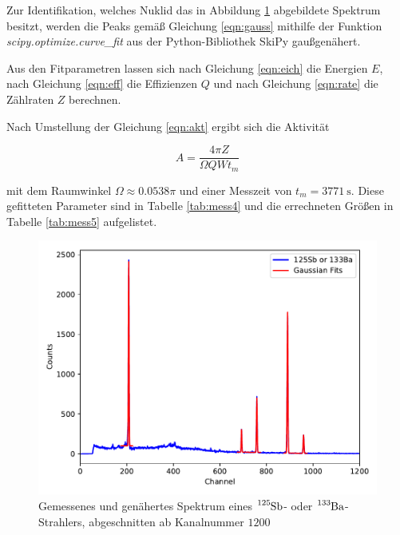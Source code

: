Zur Identifikation, welches Nuklid das in Abbildung \ref{fig:plot3} abgebildete Spektrum besitzt, werden die Peaks gemäß
Gleichung \eqref{eqn:gauss} mithilfe der Funktion \textit{scipy.optimize.curve\_fit} aus der Python-Bibliothek SkiPy
gaußgenähert.

Aus den Fitparametren lassen sich nach Gleichung \eqref{eqn:eich} die Energien $E$, nach Gleichung 
\eqref{eqn:eff} die Effizienzen $Q$ und nach Gleichung \eqref{eqn:rate} die Zählraten $Z$ berechnen.

Nach Umstellung der Gleichung \eqref{eqn:akt} ergibt sich die Aktivität

\begin{equation}
  A = \frac{4 \pi Z}{\Omega Q W t_m}
\end{equation}

mit dem Raumwinkel $\Omega \approx \num{0.0538} \pi$ und einer Messzeit von $t_m = \SI{3771}{\second}$.
Diese gefitteten Parameter sind in Tabelle \ref{tab:mess4} und die errechneten Größen in Tabelle \ref{tab:mess5} aufgelistet.


\begin{figure}[H]
  \centering
  \includegraphics[scale=0.65]{content/plot3.pdf}
  \caption{Gemessenes und genähertes Spektrum eines $\ce{^{125}Sb}$- oder  $\ce{^{133}Ba}$-Strahlers,
           abgeschnitten ab Kanalnummer $\num{1200}$}
  \label{fig:plot3}
\end{figure}

